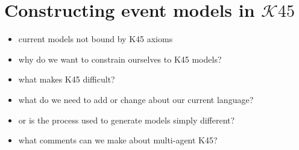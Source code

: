 \section{Constructing event models in $\mathcal{K}45$}


\begin{itemize}
	\item current models not bound by K45 axioms
	\item why do we want to constrain ourselves to K45 models?
	\item what makes K45 difficult?
	\item what do we need to add or change about our current language?
	\item or is the process used to generate models simply different?
	\item what comments can we make about multi-agent K45?
\end{itemize}
